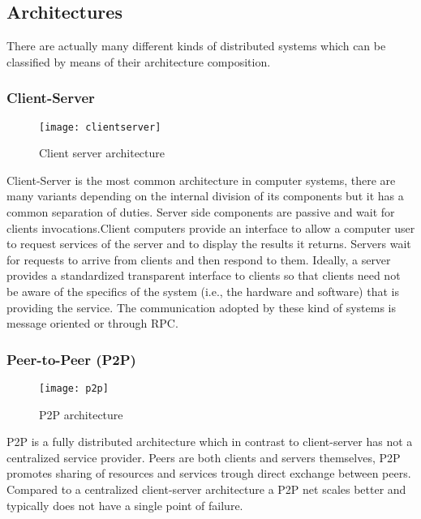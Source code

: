 \subsection{Architectures}
\par
There are actually many different kinds of distributed systems which can be classified by means of their architecture composition.
\subsubsection{Client-Server}
\begin{figure}[h]
	\centering
	\texttt{[image: clientserver]}
	\caption{Client server architecture}
	\label{fig:2.12}
\end{figure} 
 Client-Server is the most common architecture in computer systems, there are many variants depending on the internal division of its components but it has a common separation of duties. Server side components are passive and wait for clients invocations.Client computers provide an interface to allow a computer user to request services of the server and to display the results it returns. Servers wait for requests to arrive from clients and then respond to them. Ideally, a server provides a standardized transparent interface to clients so that clients need not be aware of the specifics of the system (i.e., the hardware and software) that is providing the service. The communication adopted by these kind of systems is message oriented or through RPC.


\subsubsection{Peer-to-Peer (P2P)}\label{P2P}
\begin{figure}[h]
	\centering
	\texttt{[image: p2p]}
	\caption{P2P architecture}
	\label{fig:2.13}
\end{figure} P2P is a fully distributed architecture which in contrast to client-server has not a centralized service provider. Peers are both clients and servers themselves, P2P promotes sharing of resources and services trough direct exchange between peers. Compared to a centralized client-server architecture a P2P net scales better and typically does not have a single point of failure. 

